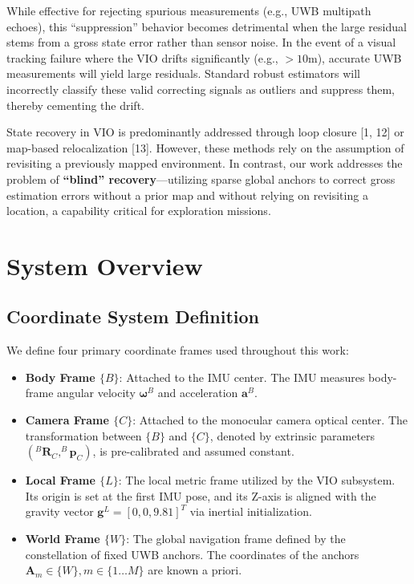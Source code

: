 \documentclass[conference]{IEEEtran}
\begin{document}
While effective for rejecting spurious measurements (e.g., UWB multipath echoes), this ``suppression'' behavior becomes detrimental when the large residual stems from a gross state error rather than sensor noise. In the event of a visual tracking failure where the VIO drifts significantly (e.g., $>10$m), accurate UWB measurements will yield large residuals. Standard robust estimators will incorrectly classify these valid correcting signals as outliers and suppress them, thereby cementing the drift. 

State recovery in VIO is predominantly addressed through loop closure [1, 12] or map-based relocalization [13]. However, these methods rely on the assumption of revisiting a previously mapped environment. In contrast, our work addresses the problem of \textbf{``blind'' recovery}—utilizing sparse global anchors to correct gross estimation errors without a prior map and without relying on revisiting a location, a capability critical for exploration missions.

\section{System Overview}

\subsection{Coordinate System Definition}
We define four primary coordinate frames used throughout this work:

\begin{itemize}
    \item \textbf{Body Frame $\{B\}$}: Attached to the IMU center. The IMU measures body-frame angular velocity $\boldsymbol{\omega}^B$ and acceleration $\mathbf{a}^B$.
    \item \textbf{Camera Frame $\{C\}$}: Attached to the monocular camera optical center. The transformation between $\{B\}$ and $\{C\}$, denoted by extrinsic parameters $(^B\mathbf{R}_C, ^B\mathbf{p}_C)$, is pre-calibrated and assumed constant.
    \item \textbf{Local Frame $\{L\}$}: The local metric frame utilized by the VIO subsystem. Its origin is set at the first IMU pose, and its Z-axis is aligned with the gravity vector $\mathbf{g}^L = [0, 0, 9.81]^T$ via inertial initialization.
    \item \textbf{World Frame $\{W\}$}: The global navigation frame defined by the constellation of fixed UWB anchors. The coordinates of the anchors $\mathbf{A}_m \in \{W\}, m \in \{1 \dots M\}$ are known a priori.
\end{itemize}
\end{document}
